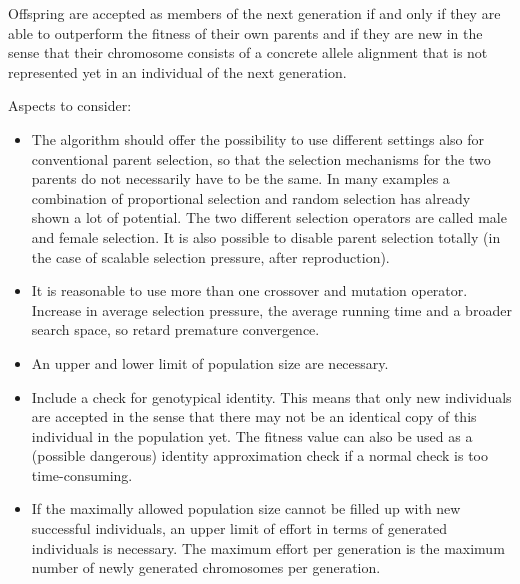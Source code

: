 \documentclass[12pt]{book}
\begin{document}
Offspring are accepted as members of the next generation if and only if they are able to outperform the fitness of their own parents and if they are new in the sense that their chromosome consists of a concrete allele alignment that is not represented yet in an individual of the next generation.

Aspects to consider:
\begin{itemize}
\item The algorithm should offer the possibility to use different settings also for conventional parent selection, so that the selection mechanisms for the two parents do not necessarily have to be the same. In many examples a combination of proportional selection and random selection has already shown a lot of potential. The two different selection operators are called male and female selection. It is also possible to disable parent selection totally (in the case of scalable selection pressure, after reproduction).
\item It is reasonable to use more than one crossover and mutation operator. Increase in average selection pressure, the average running time and a broader search space, so retard premature convergence.
\item An upper and lower limit of population size are necessary.
\item Include a check for genotypical identity. This means that only new individuals are accepted in the sense that there may not be an identical copy of this individual in the population yet. The fitness value can also be used as a (possible dangerous) identity approximation check if a normal check is too time-consuming.
\item If the maximally allowed population size cannot be filled up with new successful individuals, an upper limit of effort in terms of generated individuals is necessary. The maximum effort per generation is the maximum number of newly generated chromosomes per generation.
\end{itemize}
\end{document}
